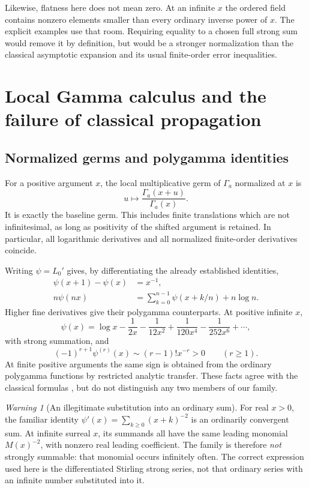 \documentclass[11pt,letterpaper]{article}
\numberwithin{equation}{section}
\theoremstyle{plain}
\theoremstyle{definition}
\theoremstyle{remark}
\newtheorem{warning}[warning]{Warning}
\begin{document}
Likewise, flatness here does not mean zero. At an infinite $x$ the ordered
field contains nonzero elements smaller than every ordinary inverse power
of $x$. The explicit examples use that room. Requiring equality to a chosen
full strong sum would remove it by definition, but would be a stronger
normalization than the classical asymptotic expansion and its usual
finite-order error inequalities.

\section{Local Gamma calculus and the failure of classical propagation}
\label{sec:local}

\subsection{Normalized germs and polygamma identities}
For a positive argument $x$, the local multiplicative germ of $\Gamma_a$
normalized at $x$ is
\[
 u\longmapsto\frac{\Gamma_a(x+u)}{\Gamma_a(x)}.
\]
It is exactly the baseline germ. This includes finite translations which
are not infinitesimal, as long as positivity of the shifted argument is
retained. In particular, all logarithmic derivatives and all normalized
finite-order derivatives coincide.

Writing $\psi=L_0'$ gives, by differentiating the already established
identities,
\begin{align}
 \psi(x+1)-\psi(x)&=x^{-1},\\
 n\psi(nx)&=\sum_{k=0}^{n-1}\psi(x+k/n)+n\log n.
\end{align}
Higher fine derivatives give their polygamma counterparts. At positive
infinite $x$,
\[
 \psi(x)=\log x-\frac1{2x}-\frac1{12x^2}
 +\frac1{120x^4}-\frac1{252x^6}+\cdots,
\]
with strong summation, and
\[
 (-1)^{r+1}\psi^{(r)}(x)\sim(r-1)!x^{-r}>0
 \qquad(r\ge1).
\]
At finite positive arguments the same sign is obtained from the ordinary
polygamma functions by restricted analytic transfer. These facts agree with
the classical formulas \cite{DLMF515}, but do not distinguish any two
members of our family.

\begin{warning}[An illegitimate substitution into an ordinary sum]
For real $x>0$, the familiar identity
$\psi'(x)=\sum_{k\ge0}(x+k)^{-2}$ is an ordinarily convergent sum.
At infinite surreal $x$, its summands all have the same leading monomial
$M(x)^{-2}$, with nonzero real leading coefficient. The family is therefore
\emph{not} strongly summable: that monomial occurs infinitely often.
The correct expression used here is the differentiated Stirling strong
series, not that ordinary series with an infinite number substituted into it.
\end{warning}
\end{document}
